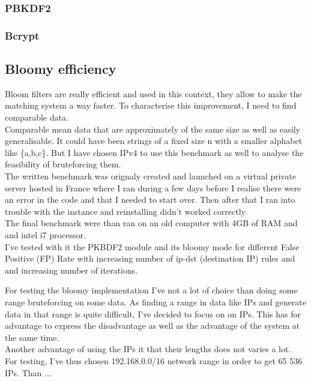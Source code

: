 \documentclass{eplmastersthesis}
\begin{document}
\subsubsection{PBKDF2}
\subsubsection{Bcrypt}


\subsection{Bloomy efficiency}

Bloom filters are really efficient and used in this context, they allow to make the matching system a way faster. To characterise this improvement, I need to find comparable data.\\
Comparable mean data that are approximately of the same size as well as easily generalisable. It could have been strings of a fixed size n with a smaller alphabet like \{a,b,c\}. But I have chosen IPv4 to use this benchmark as well to analyse the feasibility of  bruteforcing them.\\

The written benchmark was orignaly created and launched on a virtual private server hosted in France where I ran during a few days before I realise there were an error in the code and that I needed to start over. Then after that I ran into trouble with the instance and reinstalling didn't worked correctly.\\
The final benchmark were than ran on an old computer with 4GB of RAM and and intel i7 processor.\\
I've tested with it the PKBDF2 module and its bloomy mode for different False Positive (FP) Rate with increasing number of ip-dst (destination IP) rules and and increasing number of iterations.


For testing the bloomy implementation I've not a lot of choice than doing some range bruteforcing on some data.
As finding a range in data like IPs and generate data in that range is quite difficult, I've decided to focus on on IPs. This has for advantage to express the disadvantage as well as the advantage of the system at the same time.\\
Another advantage of using the IPs it that their lengths does not varies a lot.\\

For testing, I've thus chosen 192.168.0.0/16 network range in order to get 65 536 IPs. Than ...
\end{document}

